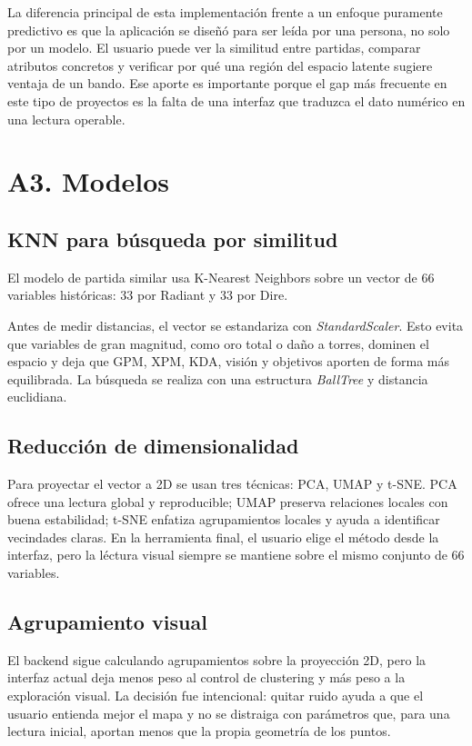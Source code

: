 \documentclass[conference]{IEEEtran}
\begin{document}
La diferencia principal de esta implementaci\'on frente a un enfoque
puramente predictivo es que la aplicaci\'on se dise\~n\'o para ser le\'ida
por una persona, no solo por un modelo. El usuario puede ver la
similitud entre partidas, comparar atributos concretos y verificar por
qu\'e una regi\'on del espacio latente sugiere ventaja de un bando. Ese
aporte es importante porque el gap m\'as frecuente en este tipo de
proyectos es la falta de una interfaz que traduzca el dato num\'erico en
una lectura operable.

\section{A3. Modelos}
\subsection{KNN para b\'usqueda por similitud}
El modelo de partida similar usa K-Nearest Neighbors sobre un vector de
66 variables hist\'oricas: 33 por Radiant y 33 por Dire.

Antes de medir distancias, el vector se estandariza con
\textit{StandardScaler}. Esto evita que variables de gran magnitud, como
oro total o da\~no a torres, dominen el espacio y deja que GPM, XPM, KDA,
visi\'on y objetivos aporten de forma m\'as equilibrada. La b\'usqueda se
realiza con una estructura \textit{BallTree} y distancia euclidiana.

\subsection{Reducci\'on de dimensionalidad}
Para proyectar el vector a 2D se usan tres t\'ecnicas: PCA, UMAP y
t-SNE. PCA ofrece una lectura global y reproducible; UMAP preserva
relaciones locales con buena estabilidad; t-SNE enfatiza agrupamientos
locales y ayuda a identificar vecindades claras. En la herramienta final,
el usuario elige el m\'etodo desde la interfaz, pero la l\'ectura visual
siempre se mantiene sobre el mismo conjunto de 66 variables.

\subsection{Agrupamiento visual}
El backend sigue calculando agrupamientos sobre la proyecci\'on 2D, pero
la interfaz actual deja menos peso al control de clustering y m\'as peso
a la exploraci\'on visual. La decisi\'on fue intencional: quitar ruido
ayuda a que el usuario entienda mejor el mapa y no se distraiga con
par\'ametros que, para una lectura inicial, aportan menos que la propia
geometr\'ia de los puntos.
\end{document}
